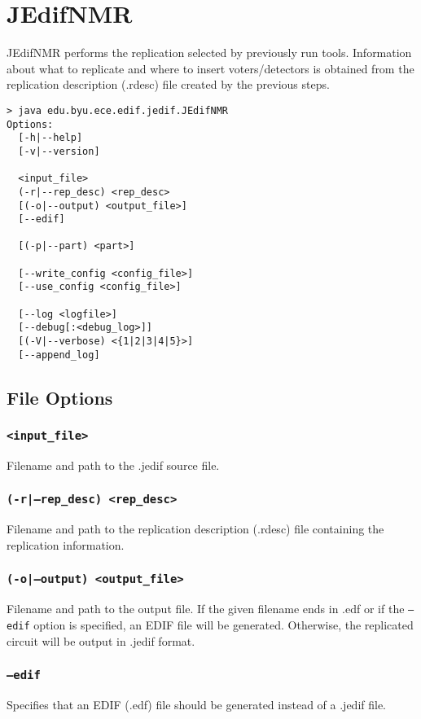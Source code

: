 \section{JEdifNMR}
JEdifNMR performs the replication selected by previously run
tools. Information about what to replicate and where to insert
voters/detectors is obtained from the replication description (.rdesc)
file created by the previous steps.

\begin{verbatim}
> java edu.byu.ece.edif.jedif.JEdifNMR
Options:
  [-h|--help]
  [-v|--version]

  <input_file>
  (-r|--rep_desc) <rep_desc>
  [(-o|--output) <output_file>]
  [--edif]

  [(-p|--part) <part>]
  
  [--write_config <config_file>]
  [--use_config <config_file>]

  [--log <logfile>]
  [--debug[:<debug_log>]]
  [(-V|--verbose) <{1|2|3|4|5}>]
  [--append_log]
\end{verbatim}

\subsection{File Options}

\subsubsection{\texttt{<input\_file>}}
Filename and path to the .jedif source file.

\subsubsection{\texttt{(-r|--rep\_desc) <rep\_desc>}}
Filename and path to the replication description (.rdesc) file containing the
replication information.

\subsubsection{\texttt{(-o|--output) <output\_file>}}
Filename and path to the output file. If the given filename ends in .edf or if
the \texttt{--edif} option is specified, an EDIF file will be generated.
Otherwise, the replicated circuit will be output in .jedif format.

\subsubsection{\texttt{--edif}}
Specifies that an EDIF (.edf) file should be generated instead of a .jedif file.






